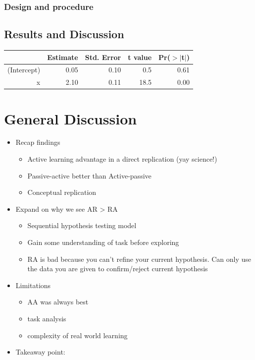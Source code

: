 \documentclass[10pt, letterpaper]{article}
\begin{document}
\subsubsection{Design and procedure}\label{design-and-procedure-3}

\subsection{Results and Discussion}\label{results-and-discussion-3}

\begin{table}[H]
\centering
\begin{tabular}{rrrrr}
  \hline
 & Estimate & Std. Error & t value & Pr($>$$|$t$|$) \\ 
  \hline
(Intercept) & 0.05 & 0.10 & 0.5 & 0.61 \\ 
  x & 2.10 & 0.11 & 18.5 & 0.00 \\ 
   \hline
\end{tabular}
\end{table}

\section{General Discussion}\label{general-discussion}

\begin{itemize}
\itemsep1pt\parskip0pt
\item
  Recap findings

  \begin{itemize}
  \itemsep1pt\parskip0pt
  \item
    Active learning advantage in a direct replication (yay science!)
  \item
    Passive-active better than Active-passive
  \item
    Conceptual replication
  \end{itemize}
\item
  Expand on why we see AR \textgreater{} RA

  \begin{itemize}
  \itemsep1pt\parskip0pt
  \item
    Sequential hypothesis testing model
  \item
    Gain some understanding of task before exploring
  \item
    RA is bad because you can't refine your current hypothesis. Can only
    use the data you are given to confirm/reject current hypothesis
  \end{itemize}
\item
  Limitations

  \begin{itemize}
  \itemsep1pt\parskip0pt
  \item
    AA was always best
  \item
    task analysis
  \item
    complexity of real world learning
  \end{itemize}
\item
  Takeaway point:
\end{itemize}
\end{document}
